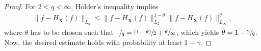 \documentclass[10pt,a4paper]{amsart}
\begin{document}
\begin{proof}
For $2<q<\infty$, H\"older's inequality implies
\begin{gather}
\lVert f - H_{\mathbf{X}}(f)\rVert_{L_q} \leq \lVert f - H_{\mathbf{X}}(f)\rVert_{L_2}^{1-\theta}\lVert f - H_{\mathbf{X}}(f)\rVert_{L_\infty}^\theta,
\end{gather}
where $\theta$ has to be chosen such that $\sfrac{1}{q}= \sfrac{(1-\theta)}{2}+ \sfrac{\theta}{\infty}$, which yields $\theta = 1 - \sfrac{2}{q}$.
Now, the desired estimate holds with probability at least $1-\gamma$.
\end{proof}
\end{document}
